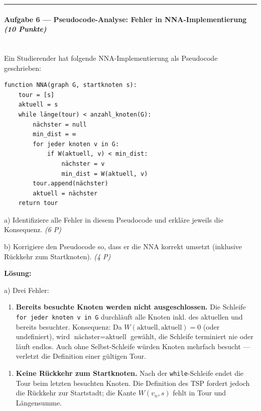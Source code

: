 \documentclass[11pt, a4paper]{article}
\begin{document}
\noindent\textcolor{rulegray}{\rule{\linewidth}{0.4pt}}


\paragraph{Aufgabe 6 — Pseudocode-Analyse: Fehler in NNA-Implementierung \textit{(10 Punkte)}}\mbox{}\\[2pt]

Ein Studierender hat folgende NNA-Implementierung als Pseudocode geschrieben:


\begin{lstlisting}
function NNA(graph G, startknoten s):
    tour = [s]
    aktuell = s
    while länge(tour) < anzahl_knoten(G):
        nächster = null
        min_dist = ∞
        for jeder knoten v in G:
            if W(aktuell, v) < min_dist:
                nächster = v
                min_dist = W(aktuell, v)
        tour.append(nächster)
        aktuell = nächster
    return tour
\end{lstlisting}


a) Identifiziere alle Fehler in diesem Pseudocode und erkläre jeweils die Konsequenz. \textit{(6 P)}


b) Korrigiere den Pseudocode so, dass er die NNA korrekt umsetzt (inklusive Rückkehr zum Startknoten). \textit{(4 P)}


\textbf{Lösung:}


a) Drei Fehler:


\begin{enumerate}
  \item \textbf{Bereits besuchte Knoten werden nicht ausgeschlossen.} Die Schleife \texttt{for jeder knoten v in G} durchläuft alle Knoten inkl. des aktuellen und bereits besuchter. Konsequenz: Da $W(\text{aktuell},\text{aktuell})=0$ (oder undefiniert), wird $\text{nächster}=\text{aktuell}$ gewählt, die Schleife terminiert nie oder läuft endlos. Auch ohne Selbst-Schleife würden Knoten mehrfach besucht — verletzt die Definition einer gültigen Tour.
\end{enumerate}

\begin{enumerate}
  \item \textbf{Keine Rückkehr zum Startknoten.} Nach der \texttt{while}-Schleife endet die Tour beim letzten besuchten Knoten. Die Definition des TSP fordert jedoch die Rückkehr zur Startstadt; die Kante $W(v_n,s)$ fehlt in Tour und Längensumme.
\end{enumerate}
\end{document}
